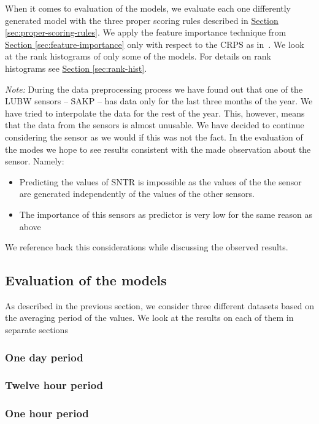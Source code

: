 \documentclass[12pt,a4paper,twoside]{scrartcl}
\numberwithin{equation}{section}
\newcommand{\refsec}[1]{\hyperref[#1]{Section \ref*{#1}}}
\begin{document}
When it comes to evaluation of the models, we evaluate each one differently generated model with the three proper scoring rules described in \refsec{sec:proper-scoring-rules}. We apply the feature importance technique from \refsec{sec:feature-importance} only with respect to the CRPS as in~\cite{lerch2018}. We look at the rank histograms of only some of the models. For details on rank histograms see \refsec{sec:rank-hist}.

\emph{Note:} During the data preprocessing process we have found out that one of the LUBW sensors -- SAKP -- has data only for the last three months of the year. We have tried to interpolate the data for the rest of the year. This, however, means that the data from the sensors is almost unusable. We have decided to continue considering the sensor as we would if this was not the fact. In the evaluation of the modes we hope to see results consistent with the made observation about the sensor. Namely:
\begin{itemize}
\item Predicting the values of SNTR is impossible as the values of the the sensor are generated independently of the values of the other sensors.
\item The importance of this sensors as predictor is very low for the same reason as above
\end{itemize}
We reference back this considerations while discussing the observed results.
\subsection{Evaluation of the models}\label{sec:eval-model}
As described in the previous section, we consider three different datasets based on the averaging period of the values. We look at the results on each of them in separate sections
\subsubsection{One day period}



\subsubsection{Twelve hour period}


\subsubsection{One hour period}
\end{document}
